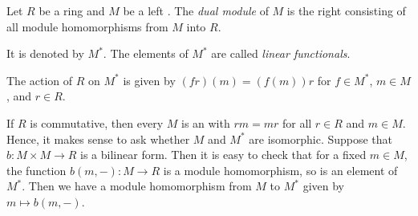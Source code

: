 \documentclass[12pt]{article}
\begin{document}
Let $R$ be a ring and $M$ be a left . The {\it dual module} of $M$ is
the right  consisting of all module homomorphisms  from $M$ into $R$.



It is denoted by $M^\ast$. The elements of $M^\ast$ are called {\it linear functionals}.

The action of $R$ on $M^\ast$ is given by $(fr)(m) = (f(m))r$ for
$f \in M^\ast$, $m \in M$, and $r \in R$.

If $R$ is commutative, then every  $M$ is an  with $rm = mr$ for all $r \in R$ and $m \in M$. Hence, it makes sense to ask whether $M$ and $M^\ast$ are isomorphic. Suppose that 
$b: M \times M \to R$ is a bilinear form. Then it is easy to check that for a fixed
$m \in M$, the function $b(m, -): M \to R$ is a module homomorphism,
so is an element of $M^\ast$. Then we have a  module homomorphism from $M$
to $M^\ast$ given by $m \mapsto b(m,-)$. 
\end{document}
